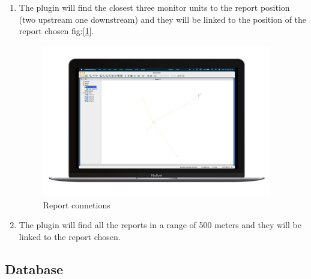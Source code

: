 \begin{enumerate}
    \item The plugin will find the closest three monitor units to the report position (two upstream one downstream) and they will be linked to the position of the report chosen fig:[\ref{optuTorial3}].
    \begin{figure}[H]
        \centering
        \includegraphics[width=27em]{img/op3.png} \caption{Report connetions} \label{optuTorial3}
    \end{figure}

    \item The plugin will find all the reports in a range of 500 meters and they will be linked to the report chosen.
\end{enumerate}


\subsection{Database}
